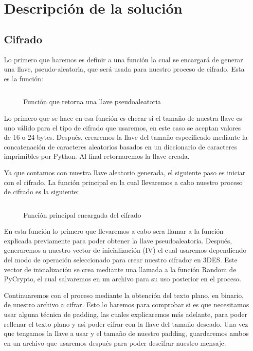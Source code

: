 \documentclass[10pt]{article}
\begin{document}
\section{Descripción de la solución}
   \subsection{Cifrado}
      	Lo primero que haremos es definir a una función la cual se encargará de generar una llave, pseudo-aleatoria, que será usada para nuestro proceso de cifrado. Esta es la función:
      
		\begin{figure}[H]
			\inputminted[linenos, firstnumber=1, breaklines, tabsize=4, firstline=78, lastline=84]{python}{code/App.py}
			\caption{Función que retorna una llave pseudoaleatoria}
		\end{figure}

		Lo primero que se hace en esa función es checar si el tamaño de nuestra llave es uno válido para el tipo de cifrado que usaremos, en este caso se aceptan valores de 16 o 24 bytes. Después, crearemos la llave del tamaño especificado mediante la concatenación de caracteres aleatorios basados en un diccionario de caracteres imprimibles por Python. Al final retornaremos la llave creada.

		Ya que contamos con nuestra llave aleatorio generada, el siguiente paso es iniciar con el cifrado. La función principal en la cual llevaremos a cabo nuestro proceso de cifrado es la siguiente:
		\begin{figure}[H]
			\inputminted[linenos, firstnumber=1, breaklines, tabsize=4, firstline=115, lastline=126]{python}{code/App.py}
			\caption{Función principal encargada del cifrado}
		\end{figure}

		En esta función lo primero que llevaremos a cabo sera llamar a la función explicada previamente para poder obtener la llave pseudoaleatoria. Después, generaremos a nuestro vector de inicialización (IV) el cual usaremos dependiendo del modo de operación seleccionado para crear nuestro cifrador en 3DES. Este vector de inicialización se crea mediante una llamada a la función Random de PyCrypto, el cual salvaremos en un archivo para su uso posterior en el proceso.

		Continuaremos con el proceso mediante la obtención del texto plano, en binario, de nuestro archivo a cifrar. Esto lo haremos para comprobar si es que necesitamos usar alguna técnica de padding, las cuales explicaremos más adelante, para poder rellenar el texto plano y asi poder cifrar con la llave del tamaño deseado. Una vez que tengamos la llave a usar y el tamaño de nuestro padding, guardaremos ambos en un archivo que usaremos después para poder descifrar nuestro mensaje.
\end{document}
